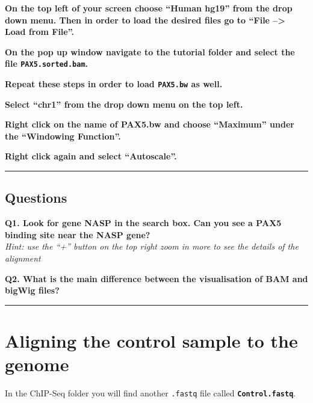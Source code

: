 \documentclass[11pt]{article}
\begin{document}
    \textbf{On the top left of your screen choose ``Human hg19'' from the
drop down menu. Then in order to load the desired files go to ``File
--\textgreater{} Load from File''.}

\textbf{On the pop up window navigate to the tutorial folder and select
the file \texttt{PAX5.sorted.bam}.}

\textbf{Repeat these steps in order to load \texttt{PAX5.bw} as well.}

\textbf{Select ``chr1'' from the drop down menu on the top left.}

\textbf{Right click on the name of PAX5.bw and choose ``Maximum'' under
the ``Windowing Function''.}

\textbf{Right click again and select ``Autoscale''.}

    \begin{center}\rule{0.5\linewidth}{.4pt}\end{center}

    \hypertarget{questions}{%
\subsection{Questions}\label{questions}}

\textbf{Q1. Look for gene NASP in the search box. Can you see a PAX5
binding site near the NASP gene?}\\
\textit{Hint: use the ``+'' button on the top right zoom in more to see
the details of the alignment}

\textbf{Q2. What is the main difference between the visualisation of BAM
and bigWig files?}

    \begin{center}\rule{0.5\linewidth}{.4pt}\end{center}





\newpage





    \hypertarget{aligning-the-control-sample-to-the-genome}{%
\section{Aligning the control sample to the
genome}\label{aligning-the-control-sample-to-the-genome}}

    In the ChIP-Seq folder you will find another \texttt{.fastq} file called
\textbf{\texttt{Control.fastq}}.
\end{document}
